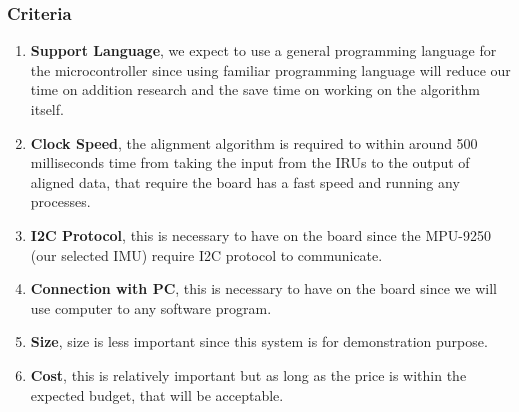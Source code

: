 \subsubsection{Criteria}
\begin{enumerate}
	\item \textbf{Support Language}, we expect to use a general programming language for the microcontroller since using familiar programming language will reduce our time on addition research and the save time on working on the algorithm itself.
	\item \textbf{Clock Speed}, the alignment algorithm is required to within around 500 milliseconds time from taking the input from the IRUs to the output of aligned data, that require the board has a fast speed and running any processes.
	\item \textbf{I2C Protocol}, this is necessary to have on the board since the MPU-9250 (our selected IMU) require I2C protocol to communicate.
	\item \textbf{Connection with PC}, this is necessary to have on the board since we will use computer to any software program.
	\item \textbf{Size}, size is less important since this system is for demonstration purpose.
	\item \textbf{Cost}, this is relatively important but as long as the price is within the expected budget, that will be acceptable.\\
\end{enumerate}

\newpage
